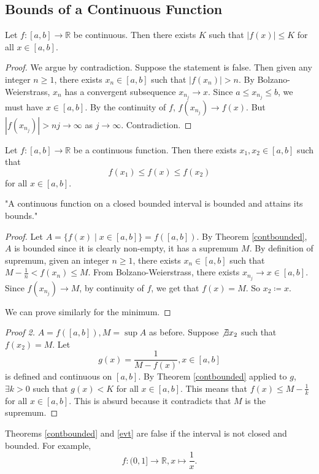 \subsection{Bounds of a Continuous Function}
\leavevmode
\begin{theorem}
    \label{contbounded}
    Let \(f:[a,b] \to \mathbb{R}\) be continuous. Then there exists \(K\) such that \(\left\vert f(x) \right\vert \leq K\) for all \(x \in [a,b]\).
\end{theorem}
\begin{proof}
    We argue by contradiction. Suppose the statement is false. Then given any integer \(n \geq 1\), there exists \(x_n \in [a,b]\) such that \(\left\vert f(x_n) \right\vert  > n\). By Bolzano-Weierstrass, \(x_n\) has a convergent subsequence \(x_{n_j} \to x\). Since \(a \leq x_{n_j} \leq b\), we must have \(x \in [a,b]\). By the continuity of \(f\), \(f(x_{n_j}) \to f(x)\). But \(\left\vert f(x_{n_j}) \right\vert > nj \to \infty\) as \(j\to \infty\). Contradiction.
\end{proof}
\begin{theorem}
    \label{evt}
    Let \(f:[a,b] \to \mathbb{R}\) be a continuous function. Then there exists \(x_1, x_2 \in [a,b]\) such that
    \[
        f(x_1) \leq f(x) \leq f(x_2)
    \]
    for all \(x \in [a,b]\).
    
    "A continuous function on a closed bounded interval is bounded and attains its bounds."
\end{theorem}
\begin{proof}
    Let \(A = \{f(x)\mid x \in [a,b]\} = f([a,b])\). By Theorem \eqref{contbounded}, \(A\) is bounded since it is clearly non-empty, it has a supremum \(M\). By definition of supremum, given an integer \(n\geq 1\), there exists \(x_n \in [a,b]\) such that \(M-\frac{1}{n}<f(x_n) \leq M\). From Bolzano-Weierstrass, there exists \(x_{n_j} \to x \in [a,b]\). Since \(f(x_{n_j}) \to M\), by continuity of \(f\), we get that \(f(x) = M\). So \(x_2\coloneqq x\).

    We can prove similarly for the minimum.
\end{proof}
\begin{proof}[Proof 2]
    \(A = f([a,b]), M = \sup A\) as before. Suppose \(\not\exists x_2\) such that \(f(x_2) = M\). Let
    \[g(x) = \frac{1}{M - f(x)}, x \in [a,b]\]
    is defined and continuous on \([a,b]\). By Theorem \eqref{contbounded} applied to \(g\), \(\exists k >0\) such that \(g(x) < K\) for all \(x \in [a,b]\). This means that \(f(x) \leq M - \frac{1}{k}\) for all \(x \in [a,b]\). This is absurd because it contradicts that \(M\) is the supremum.
\end{proof}
\begin{note}
    Theorems \eqref{contbounded} and \eqref{evt} are false if the interval is not closed and bounded. For example,
    \[
        f: (0,1] \to \mathbb{R}, x \mapsto \frac{1}{x}.
    \]
\end{note}
